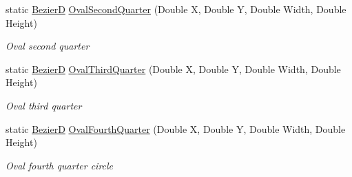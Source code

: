 \begin{DoxyCompactItemize}
static \hyperlink{class_pdf_file_writer_1_1_bezier_d}{BezierD} \hyperlink{class_pdf_file_writer_1_1_bezier_d_acb5f1b03e6789158d7e9bc6ea72d3573}{Oval\+Second\+Quarter} (Double X, Double Y, Double Width, Double Height)
\begin{DoxyCompactList}\small\item\em Oval second quarter \end{DoxyCompactList}\item 
static \hyperlink{class_pdf_file_writer_1_1_bezier_d}{BezierD} \hyperlink{class_pdf_file_writer_1_1_bezier_d_a710529328c4f7d2371acac53f4d951f9}{Oval\+Third\+Quarter} (Double X, Double Y, Double Width, Double Height)
\begin{DoxyCompactList}\small\item\em Oval third quarter \end{DoxyCompactList}\item 
static \hyperlink{class_pdf_file_writer_1_1_bezier_d}{BezierD} \hyperlink{class_pdf_file_writer_1_1_bezier_d_a0d080aaeef107c8f2d4a6f38de41221d}{Oval\+Fourth\+Quarter} (Double X, Double Y, Double Width, Double Height)
\begin{DoxyCompactList}\small\item\em Oval fourth quarter circle \end{DoxyCompactList}\end{DoxyCompactItemize}

